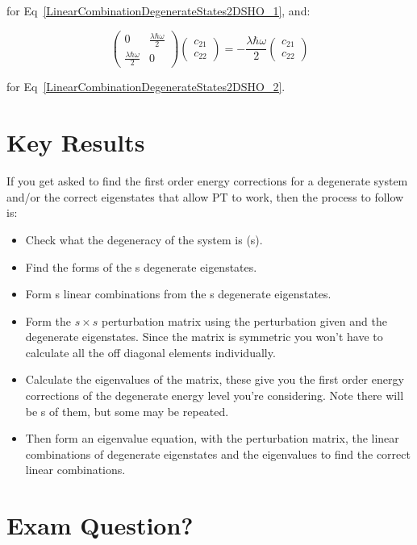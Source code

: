 \noindent for Eq~\ref{LinearCombinationDegenerateStates2DSHO_1}, and:

\begin{equation}
    \begin{pmatrix} 0 & \frac{\lambda \hbar \omega}{2} \\ \frac{\lambda \hbar \omega}{2} & 0 \end{pmatrix} \begin{pmatrix} c_{21} \\ c_{22} \end{pmatrix} = - \frac{\lambda \hbar \omega}{2} \begin{pmatrix} c_{21} \\ c_{22} \end{pmatrix}
\end{equation}

\noindent for Eq~\ref{LinearCombinationDegenerateStates2DSHO_2}.

\section{Key Results}

If you get asked to find the first order energy corrections for a degenerate system and/or the correct eigenstates that allow PT to work, then the process to follow is:

\begin{itemize}
    \item Check what the degeneracy of the system is (s).
    \item Find the forms of the s degenerate eigenstates.
    \item Form s linear combinations from the s degenerate eigenstates.
    \item Form the $s \times s$ perturbation matrix using the perturbation given and the degenerate eigenstates. Since the matrix is symmetric you won't have to calculate all the off diagonal elements individually.
    \item Calculate the eigenvalues of the matrix, these give you the first order energy corrections of the degenerate energy level you're considering. Note there will be s of them, but some may be repeated.
    \item Then form an eigenvalue equation, with the perturbation matrix, the linear combinations of degenerate eigenstates and the eigenvalues to find the correct linear combinations.
\end{itemize}

\section{Exam Question?}



